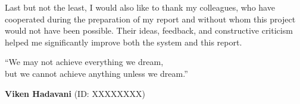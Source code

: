 \documentclass[a4paper,12pt,openany]{report}
\begin{document}
Last but not the least, I would also like to thank my colleagues, who have cooperated during the preparation of my report and without whom this project would not have been possible. Their ideas, feedback, and constructive criticism helped me significantly improve both the system and this report.

\vspace{0.5cm}
\begin{flushright}
``We may not achieve everything we dream,\\but we cannot achieve anything unless we dream.''
\end{flushright}

\vspace{1.5cm}
\begin{flushright}
\textbf{Viken Hadavani} (ID: XXXXXXXX)
\end{flushright}


\tableofcontents
\thispagestyle{empty}
\clearpage
\listoffigures
\thispagestyle{empty}
\clearpage
\listoftables
\thispagestyle{empty}

\end{document}
